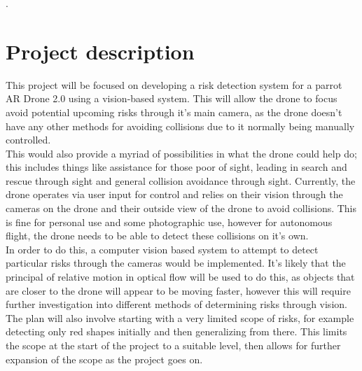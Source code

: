 \documentclass[11pt,fleqn,twoside]{article}
\begin{document}
\wordcount{}

\mmp
 .
\setcounter{tocdepth}{3} %



\section{Project description}
This project will be focused on developing a risk detection system for a parrot AR Drone 2.0 using a vision-based system. This will allow the drone to focus avoid potential upcoming risks through it's main camera, as the drone doesn't have any other methods for avoiding collisions due to it normally being manually controlled.\\

This would also provide a myriad of possibilities in what the drone could help do; this includes things like assistance for those poor of sight, leading in search and rescue through sight and general collision avoidance through sight. Currently, the drone operates via user input for control and relies on their vision through the cameras on the drone and their outside view of the drone to avoid collisions. This is fine for personal use and some photographic use, however for autonomous flight, the drone needs to be able to detect these collisions on it's own.\\

In order to do this, a computer vision based system to attempt to detect particular risks through the cameras would be implemented. It's likely that the principal of relative motion in optical flow will be used to do this, as objects that are closer to the drone will appear to be moving faster, however this will require further investigation into different methods of determining risks through vision. The plan will also involve starting with a very limited scope of risks, for example detecting only red shapes initially and then generalizing from there. This limits the scope at the start of the project to a suitable level, then allows for further expansion of the scope as the project goes on.\\
\end{document}
